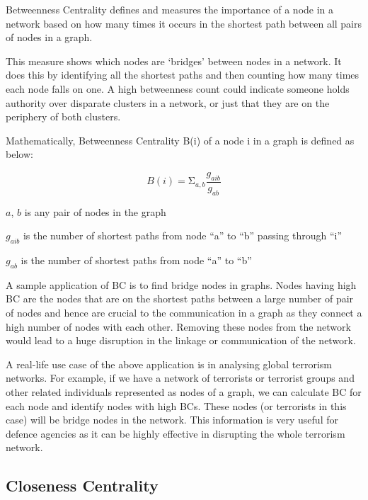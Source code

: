 \documentclass[12pt, a4paper]{article}
\begin{document}
    \begin{flushleft}
    Betweenness Centrality defines and measures the importance of a node in a network based on how many times it occurs in the shortest path between all pairs of nodes in a graph.
    
    This measure shows which nodes are ‘bridges’ between nodes in a network. It does this by identifying all the shortest paths and then counting how many times each node falls on one. A high betweenness count could indicate someone holds authority over disparate clusters in a network, or just that they are on the periphery of both clusters.
    
    Mathematically, Betweenness Centrality B(i) of a node i in a graph is defined as below:

    $$ B\left(i\right)=\mathrm{\Sigma}_{a,b}\frac{g_{aib}}{g_{ab}} $$

    $a$, $b$ is any pair of nodes in the graph
   
    $g_{aib}$ is the number of shortest paths from node “a” to “b” passing through “i”
    
    $g_{ab}$ is the number of shortest paths from node “a” to “b”

    A sample application of BC is to find bridge nodes in graphs. Nodes having high BC are the nodes that are on the shortest paths between a large number of pair of nodes and hence are crucial to the communication in a graph as they connect a high number of nodes with each other. Removing these nodes from the network would lead to a huge disruption in the linkage or communication of the network.

    A real-life use case of the above application is in analysing global terrorism networks. For example, if we have a network of terrorists or terrorist groups and other related individuals represented as nodes of a graph, we can calculate BC for each node and identify nodes with high BCs. These nodes (or terrorists in this case) will be bridge nodes in the network. This information is very useful for defence agencies as it can be highly effective in disrupting the whole terrorism network. 
    \end{flushleft}
    \subsection{Closeness Centrality}
\end{document}
